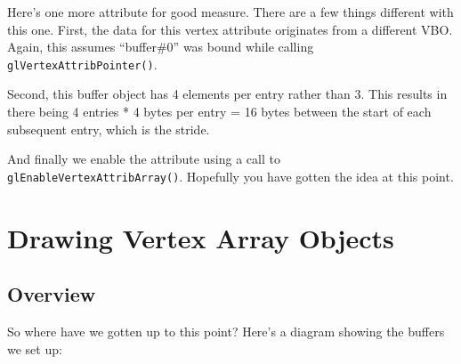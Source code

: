 Here's one more attribute for good measure. There are a few things different with this one. First, the data for this vertex attribute originates from a different VBO. Again, this assumes ``buffer\#0'' was bound while calling \texttt{glVertexAttribPointer()}. 

Second, this buffer object has 4 elements per entry rather than 3. This results in there being 4 entries * 4 bytes per entry = 16 bytes between the start of each subsequent entry, which is the stride. 

\newpage


And finally we enable the attribute using a call to \texttt{glEnableVertexAttribArray()}. Hopefully you have gotten the idea at this point.

\section{Drawing Vertex Array Objects}

\subsection{Overview}

So where have we gotten up to this point? Here's a diagram showing the buffers we set up:

